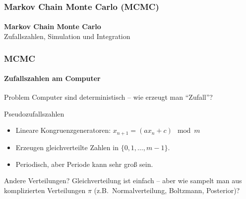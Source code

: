 \documentclass{beamer}
\begin{document}

\begin{frame}
    \frametitle{Markov Chain Monte Carlo (MCMC)}
\framesubtitle{}
\begin{center}
{\Large \textbf{Markov Chain Monte Carlo}}\\[0.5cm]
{\large Zufallszahlen, Simulation und Integration}
\end{center}
 \end{frame}



\begin{frame}
    \frametitle{MCMC}
\framesubtitle{Zufallszahlen am Computer}
    \begin{block}{Problem}
Computer sind deterministisch -- wie erzeugt man ``Zufall''?
\end{block}
\begin{block}{Pseudozufallszahlen}
\begin{itemize}
\item Lineare Kongruenzgeneratoren: $x_{n+1} = (a x_n + c) \mod m$
\item Erzeugen gleichverteilte Zahlen in $\{0, 1, \ldots, m-1\}$.
\item Periodisch, aber Periode kann sehr groß sein.
\end{itemize}
\end{block}
\begin{block}{Andere Verteilungen?}
Gleichverteilung ist einfach -- aber wie sampelt man aus komplizierten Verteilungen $\pi$ (z.B.\ Normalverteilung, Boltzmann, Posterior)?
\end{block}
 \end{frame}


\end{document}
